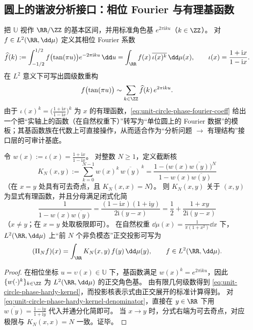\subsection{圆上的谐波分析接口：相位 Fourier 与有理基函数}\label{subsec:unit-circle-phase-fourier}
把 \(\mathbb{U}\) 视作 \(\RR/\ZZ\) 的基本区间，并用标准角色基 \(e^{2\pi\mathrm{i}ku}\)（\(k\in\ZZ\)）。
对 \(f\in L^2(\RR,\dd\mu)\) 定义其相位 Fourier 系数
\begin{equation}\label{eq:unit-circle-phase-fourier-coeff}
\widehat f(k)
:=\int_{-1/2}^{1/2} f\bigl(\tan(\pi u)\bigr)e^{-2\pi\mathrm{i}ku}\,\dd u
=\int_{\RR} f(x)\,\overline{\iota(x)^k}\,\dd\mu(x),
\qquad
\iota(x)=\frac{1+\mathrm{i}x}{1-\mathrm{i}x}.
\end{equation}
在 \(L^2\) 意义下可写出圆级数重构
\begin{equation}\label{eq:unit-circle-phase-fourier-reconstruct}
f\bigl(\tan(\pi u)\bigr)\sim \sum_{k\in\ZZ}\widehat f(k)\,e^{2\pi\mathrm{i}ku}.
\end{equation}
由于
\(
\iota(x)^k=\bigl(\tfrac{1+\mathrm{i}x}{1-\mathrm{i}x}\bigr)^k
\)
为 \(x\) 的有理函数，\eqref{eq:unit-circle-phase-fourier-coeff} 给出一个把“实轴上的函数（在自然权重下）”转写为“单位圆上的 Fourier 数据”的模板；其基函数族在代数上可直接操作，从而适合作为“分析问题 \(\to\) 有理结构”接口层的可审计基底。

\begin{proposition}\label{prop:unit-circle-phase-hardy-kernel-rational}
令
\(
w(x):=\iota(x)=\frac{1+\mathrm{i}x}{1-\mathrm{i}x}
\)。
对整数 \(N\ge 1\)，定义截断核
\begin{equation}\label{eq:unit-circle-phase-hardy-kernel}
\boxed{\;
K_N(x,y):=\sum_{k=0}^{N-1} w(x)^k\,\overline{w(y)}^{\,k}
=\frac{1-\bigl(w(x)\overline{w(y)}\bigr)^N}{1-w(x)\overline{w(y)}}\;}
\end{equation}
（在 \(x=y\) 处具有可去奇点，且 \(K_N(x,x)=N\)）。
则 \(K_N(x,y)\) 关于 \((x,y)\) 为显式有理函数，并且分母满足闭式化简
\begin{equation}\label{eq:unit-circle-phase-hardy-kernel-denominator}
\boxed{\;
\frac{1}{1-w(x)\overline{w(y)}}
=\frac{(1-\mathrm{i}x)(1+\mathrm{i}y)}{2\mathrm{i}(y-x)}
=\frac12+\frac{1+xy}{2\mathrm{i}(y-x)}\;}
\end{equation}
（\(x\neq y\)；在 \(x=y\) 处取极限即可）。
在自然权重 \(\dd\mu(x)=\frac{1}{\pi(1+x^2)}\dd x\) 下，\(L^2(\RR,\dd\mu)\) 上“前 \(N\) 个非负模态”正交投影可写为
\[
(\Pi_N f)(x)=\int_{\RR} K_N(x,y)\,f(y)\,\dd\mu(y),
\qquad f\in L^2(\RR,\dd\mu).
\]
\end{proposition}
\begin{proof}
在相位坐标 \(u=\upsilon(x)\in\mathbb{U}\) 下，基函数满足 \(w(x)^k=e^{2\pi\mathrm{i}ku}\)，因此 \(\{w(\cdot)^k\}_{k\in\ZZ}\) 为 \(L^2(\RR,\dd\mu)\) 的正交角色基。
由有限几何级数得到 \eqref{eq:unit-circle-phase-hardy-kernel}，而投影核表示式由正交展开的标准计算得到。
对 \eqref{eq:unit-circle-phase-hardy-kernel-denominator}，直接在 \(y\in\RR\) 下用 \(\overline{w(y)}=\frac{1-\mathrm{i}y}{1+\mathrm{i}y}\) 代入并通分化简即可。
当 \(x\to y\) 时，分式右端为可去奇点，对应极限与 \(K_N(x,x)=N\) 一致。证毕。
\end{proof}

